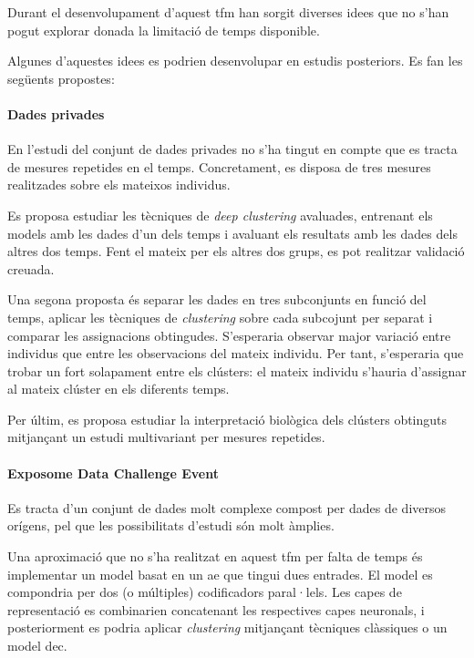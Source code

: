 \documentclass[CAT,BIB]{TFUOC}%
\begin{document}
        Durant el desenvolupament d'aquest \gls{tfm}
        han sorgit diverses idees que no s'han pogut explorar
        donada la limitació de temps disponible.

        Algunes d'aquestes idees es podrien desenvolupar
        en estudis posteriors.
        Es fan les següents propostes:

        \paragraph{Dades \gls{privades}}
            En l'estudi del conjunt de dades \gls{privades}
            no s'ha tingut en compte que es tracta de mesures repetides en el temps.
            Concretament,
            es disposa de tres mesures realitzades sobre els mateixos individus.

            Es proposa estudiar les tècniques de \textit{deep clustering} avaluades,
            entrenant els models amb les dades d'un dels temps
            i avaluant els resultats amb les dades dels altres dos temps.
            Fent el mateix per els altres dos grups,
            es pot realitzar validació creuada.

            Una segona proposta és separar les dades en tres subconjunts en funció del temps,
            aplicar les tècniques de \textit{clustering} sobre cada subcojunt per separat
            i comparar les assignacions obtingudes.
            S'esperaria observar major variació entre individus
            que entre les observacions del mateix individu.
            Per tant, s'esperaria que trobar un fort solapament entre els clústers:
            el mateix individu s'hauria d'assignar al mateix clúster en els diferents temps.

            Per últim,
            es proposa estudiar la interpretació biològica dels clústers obtinguts
            mitjançant un estudi multivariant per mesures repetides.

        \paragraph{Exposome Data Challenge Event}
            Es tracta d'un conjunt de dades molt complexe
            compost per dades de diversos orígens,
            pel que les possibilitats d'estudi són molt àmplies.

            Una aproximació que no s'ha realitzat en aquest \gls{tfm}
            per falta de temps és
            implementar un model basat en un \gls{ae}
            que tingui dues entrades.
            El model es compondria per dos (o múltiples) codificadors paral·lels.
            Les capes de representació es combinarien concatenant
            les respectives capes neuronals,
            i posteriorment es podria aplicar \textit{clustering}
            mitjançant tècniques clàssiques o un model \gls{dec}.
\end{document}
